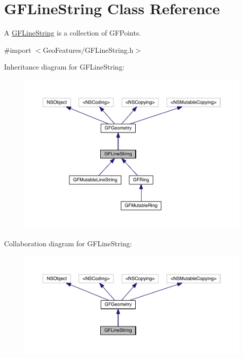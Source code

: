 \hypertarget{interface_g_f_line_string}{}\section{G\+F\+Line\+String Class Reference}
\label{interface_g_f_line_string}


A \hyperlink{interface_g_f_line_string}{G\+F\+Line\+String} is a collection of G\+F\+Points.  




{\ttfamily \#import $<$Geo\+Features/\+G\+F\+Line\+String.\+h$>$}



Inheritance diagram for G\+F\+Line\+String\+:\nopagebreak
\begin{figure}[H]
\begin{center}
\leavevmode
\includegraphics[width=350pt]{interface_g_f_line_string__inherit__graph}
\end{center}
\end{figure}


Collaboration diagram for G\+F\+Line\+String\+:\nopagebreak
\begin{figure}[H]
\begin{center}
\leavevmode
\includegraphics[width=350pt]{interface_g_f_line_string__coll__graph}
\end{center}
\end{figure}
